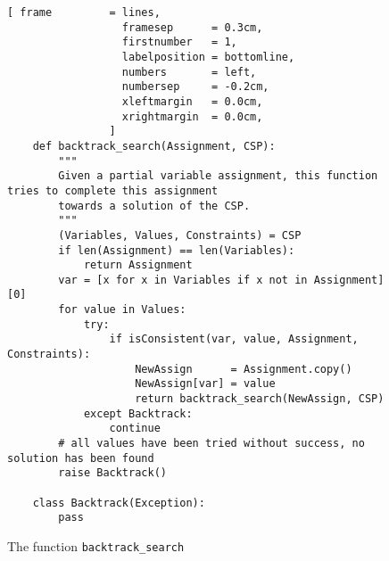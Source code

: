  \begin{figure}[!ht]
\centering
\begin{Verbatim}[ frame         = lines, 
                  framesep      = 0.3cm, 
                  firstnumber   = 1,
                  labelposition = bottomline,
                  numbers       = left,
                  numbersep     = -0.2cm,
                  xleftmargin   = 0.0cm,
                  xrightmargin  = 0.0cm,
                ]                 
    def backtrack_search(Assignment, CSP):
        """
        Given a partial variable assignment, this function tries to complete this assignment
        towards a solution of the CSP.
        """
        (Variables, Values, Constraints) = CSP
        if len(Assignment) == len(Variables):
            return Assignment
        var = [x for x in Variables if x not in Assignment][0]
        for value in Values:
            try:
                if isConsistent(var, value, Assignment, Constraints):
                    NewAssign      = Assignment.copy()
                    NewAssign[var] = value
                    return backtrack_search(NewAssign, CSP)
            except Backtrack:
                continue
        # all values have been tried without success, no solution has been found
        raise Backtrack()
    
    class Backtrack(Exception):
        pass
\end{Verbatim}
\vspace*{-0.3cm}
\caption{The function \texttt{backtrack\_search}}
\label{fig:CSP-Solver.ipynb-backtrack_search}
\end{figure}

